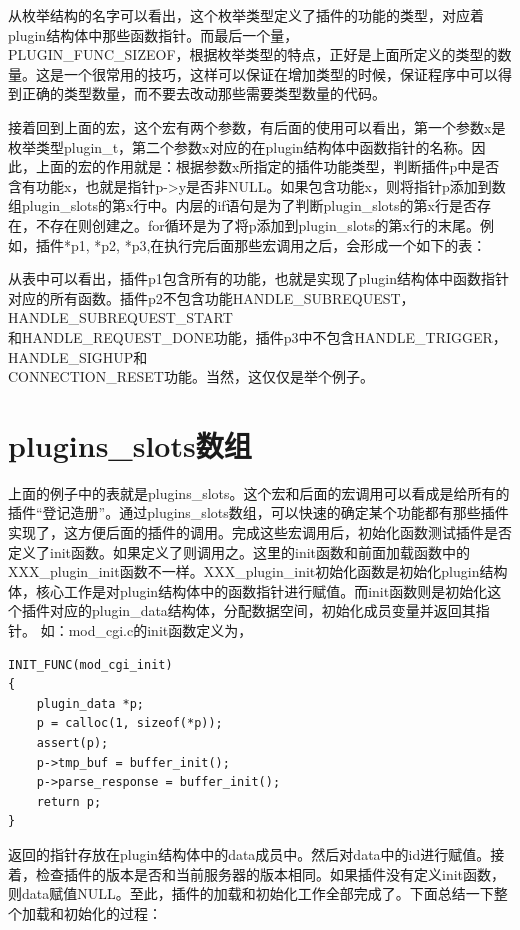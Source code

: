 \documentclass[dvipdfm]{book}
\begin{document}
从枚举结构的名字可以看出，这个枚举类型定义了插件的功能的类型，对应着plugin结构体中那些函数指针。而最后一个量，\\PLUGIN\_FUNC\_SIZEOF，根据枚举类型的特点，正好是上面所定义的类型的数量。这是一个很常用的技巧，这样可以保证在增加类型的时候，保证程序中可以得到正确的类型数量，而不要去改动那些需要类型数量的代码。


接着回到上面的宏，这个宏有两个参数，有后面的使用可以看出，第一个参数x是枚举类型plugin\_t，第二个参数x对应的在plugin结构体中函数指针的名称。因此，上面的宏的作用就是：根据参数x所指定的插件功能类型，判断插件p中是否含有功能x，也就是指针p->y是否非NULL。如果包含功能x，则将指针p添加到数组plugin\_slots的第x行中。内层的if语句是为了判断plugin\_slots的第x行是否存在，不存在则创建之。for循环是为了将p添加到plugin\_slots的第x行的末尾。例如，插件*p1, *p2, *p3,在执行完后面那些宏调用之后，会形成一个如下的表：

从表中可以看出，插件p1包含所有的功能，也就是实现了plugin结构体中函数指针对应的所有函数。插件p2不包含功能HANDLE\_SUBREQUEST，HANDLE\_SUBREQUEST\_START\\和HANDLE\_REQUEST\_DONE功能，插件p3中不包含HANDLE\_TRIGGER，HANDLE\_SIGHUP和\\CONNECTION\_RESET功能。当然，这仅仅是举个例子。

\section{plugins\_slots数组}
上面的例子中的表就是plugins\_slots。这个宏和后面的宏调用可以看成是给所有的插件“登记造册”。通过plugins\_slots数组，可以快速的确定某个功能都有那些插件实现了，这方便后面的插件的调用。完成这些宏调用后，初始化函数测试插件是否定义了init函数。如果定义了则调用之。这里的init函数和前面加载函数中的XXX\_plugin\_init函数不一样。XXX\_plugin\_init初始化函数是初始化plugin结构体，核心工作是对plugin结构体中的函数指针进行赋值。而init函数则是初始化这个插件对应的plugin\_data结构体，分配数据空间，初始化成员变量并返回其指针。
如：mod\_cgi.c的init函数定义为，

\begin{verbatim}
INIT_FUNC(mod_cgi_init)
{
	plugin_data *p;
	p = calloc(1, sizeof(*p));
	assert(p);
	p->tmp_buf = buffer_init();
	p->parse_response = buffer_init();
	return p;
}
\end{verbatim}

返回的指针存放在plugin结构体中的data成员中。然后对data中的id进行赋值。接着，检查插件的版本是否和当前服务器的版本相同。如果插件没有定义init函数，则data赋值NULL。至此，插件的加载和初始化工作全部完成了。下面总结一下整个加载和初始化的过程：
\end{document}
